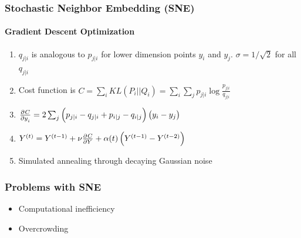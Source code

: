 \documentclass{beamer}
\begin{document}
\begin{frame}
  \frametitle{Stochastic Neighbor Embedding (SNE)}
  \framesubtitle{Gradient Descent Optimization}

  \begin{enumerate}
  \item $q_{j|i}$ is analogous to $p_{j|i}$ for lower dimension points $y_i$ and $y_j$.
    $\sigma = 1/\sqrt{2}$ for all $q_{j|i}$

  \item Cost function is $C = \sum_i KL(P_i || Q_i) = \sum_i \sum_j p_{j|i} \log\frac{p_{j|i}}{q_{j|i}}$

  \item $\pd{C}{y_i} = 2 \sum_j \del{p_{j|i} - q_{j|i} + p_{i|j} - q_{i|j}} \del{y_i - y_j}$

  \item $Y^{(t)} = Y^{(t - 1)} + \nu \pd{C}{Y} + \alpha(t) \del{Y^{(t - 1)} - Y^{(t - 2)}}$

    \item Simulated annealing through decaying Gaussian noise
  \end{enumerate}
\end{frame}

\begin{frame}
  \frametitle{Problems with SNE}

  \begin{itemize}
  \item Computational inefficiency

  \item Overcrowding
  \end{itemize}
\end{frame}
\end{document}
